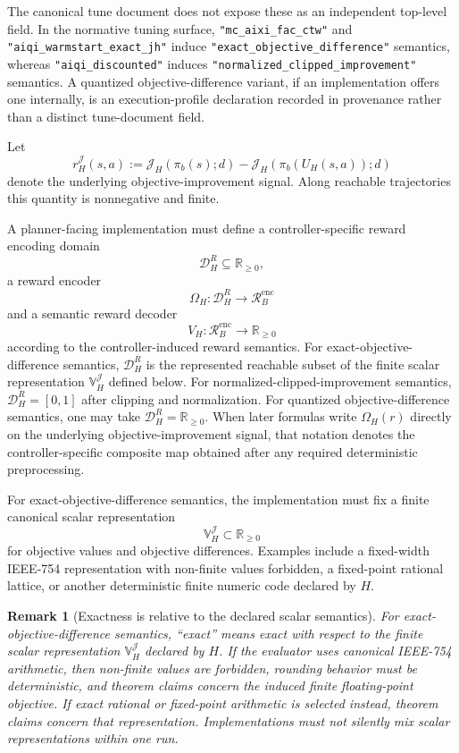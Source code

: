 \documentclass[11pt]{article}
\newtheorem{remark}{Remark}
\begin{document}
The canonical tune document does not expose these as an independent top-level
field. In the normative tuning surface,
\texttt{"mc\_aixi\_fac\_ctw"} and
\texttt{"aiqi\_warmstart\_exact\_jh"} induce
\texttt{"exact\_objective\_difference"} semantics, whereas
\texttt{"aiqi\_discounted"} induces
\texttt{"normalized\_clipped\_improvement"} semantics. A quantized
objective-difference variant, if an implementation offers one internally, is an
execution-profile declaration recorded in provenance rather than a distinct
tune-document field.

Let
\[
r_H^{\mathcal J}(s,a)
:=
\mathcal{J}_H(\pi_b(s);d)
-
\mathcal{J}_H(\pi_b(U_H(s,a));d)
\]
denote the underlying objective-improvement signal. Along reachable
trajectories this quantity is nonnegative and finite.

A planner-facing implementation must define a controller-specific reward
encoding domain
\[
\mathcal{D}_H^R\subseteq\mathbb{R}_{\ge 0},
\]
a reward encoder
\[
\Omega_H:\mathcal{D}_H^R\to \mathcal{R}_B^{\mathrm{enc}}
\]
and a semantic reward decoder
\[
V_H:\mathcal{R}_B^{\mathrm{enc}}\to\mathbb{R}_{\ge 0}
\]
according to the controller-induced reward semantics. For
exact-objective-difference semantics, \(\mathcal{D}_H^R\) is the represented
reachable subset of the finite scalar representation
\(\mathbb{V}_H^{\mathcal J}\) defined below. For
normalized-clipped-improvement semantics, \(\mathcal{D}_H^R=[0,1]\) after
clipping and normalization. For quantized objective-difference semantics, one
may take \(\mathcal{D}_H^R=\mathbb{R}_{\ge 0}\). When later formulas write
\(\Omega_H(r)\) directly on the underlying objective-improvement signal, that
notation denotes the controller-specific composite map obtained after any
required deterministic preprocessing.

For exact-objective-difference semantics, the implementation must fix a
finite canonical scalar representation
\[
\mathbb{V}_H^{\mathcal J}\subset\mathbb{R}_{\ge 0}
\]
for objective values and objective differences. Examples include a fixed-width
IEEE-754 representation with non-finite values forbidden, a fixed-point rational
lattice, or another deterministic finite numeric code declared by $H$.

\begin{remark}[Exactness is relative to the declared scalar semantics]
For exact-objective-difference semantics, ``exact'' means exact with respect to
the finite scalar representation $\mathbb{V}_H^{\mathcal J}$ declared by $H$.
If the evaluator uses canonical IEEE-754 arithmetic, then non-finite values are
forbidden, rounding behavior must be deterministic, and theorem claims concern
the induced finite floating-point objective. If exact rational or fixed-point
arithmetic is selected instead, theorem claims concern that representation.
Implementations must not silently mix scalar representations within one run.
\end{remark}
\end{document}
